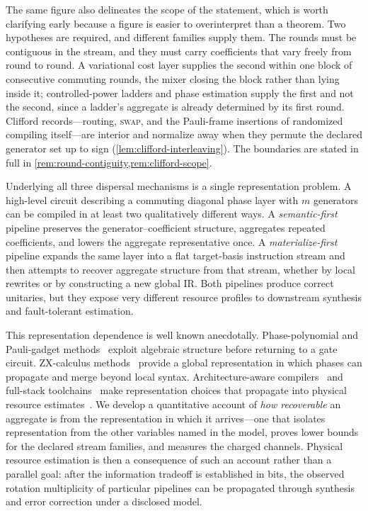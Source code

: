 \documentclass[a4paper,twocolumn,10pt,unpublished]{quantumarticle}
\begin{document}
The same figure also delineates the scope of the statement, which is
worth clarifying early because a figure is easier to overinterpret than a theorem.
Two hypotheses are required, and different families supply them.  The
rounds must be contiguous in the stream, and they must carry
coefficients that vary freely from round to round.  A variational cost
layer supplies the second within one block of consecutive commuting
rounds, the mixer closing the block rather than lying inside it;
controlled-power ladders and phase estimation supply the first and not
the second, since a ladder's aggregate is already determined by its
first round.  Clifford records---routing, \textsc{swap}, and the
Pauli-frame insertions of randomized compiling itself---are interior
and normalize away when they permute the declared generator set up to
sign (\cref{lem:clifford-interleaving}).  The boundaries
are stated in full in \cref{rem:round-contiguity,rem:clifford-scope}.

Underlying all three dispersal mechanisms is a single representation
problem.  A high-level circuit describing
a commuting diagonal phase layer with $m$ generators can be compiled in at
least two qualitatively different ways. A \emph{semantic-first} pipeline
preserves the generator--coefficient structure, aggregates repeated
coefficients, and lowers the aggregate representative once. A
\emph{materialize-first} pipeline expands the same layer into a flat
target-basis instruction stream and then attempts to recover aggregate
structure from that stream, whether by local rewrites or by constructing
a new global IR.  Both pipelines produce correct unitaries,
but they expose very different resource profiles to downstream synthesis
and fault-tolerant estimation.

This representation dependence is well known anecdotally. Phase-polynomial
and Pauli-gadget
methods~\cite{amy2014tdepth,nam2018automated,cowtan2020phase,amy2019cnot,beaudrap2020techniques}
exploit algebraic structure before returning to a gate circuit.
ZX-calculus
methods~\cite{duncan2020graph,kissinger2020reducing,kissinger2020pyzx,vandewetering2020zx}
provide a global representation in which phases can propagate and merge
beyond local syntax. Architecture-aware
compilers~\cite{martiel2022architecture,meijer2023architecture} and full-stack
toolchains~\cite{watkins2024surfacecode} make representation choices that
propagate into physical resource
estimates~\cite{beverland2022assessing}.  We develop a
quantitative account of \emph{how recoverable} an aggregate is from the
representation in which it arrives---one that isolates representation from
the other variables named in the model, proves lower bounds for the
declared stream families, and measures the charged channels.  Physical resource estimation
is then a consequence of such an account rather than a parallel goal:
after the information tradeoff is established in bits, the observed
rotation multiplicity of particular pipelines can be propagated through
synthesis and error correction under a disclosed model.
\end{document}
